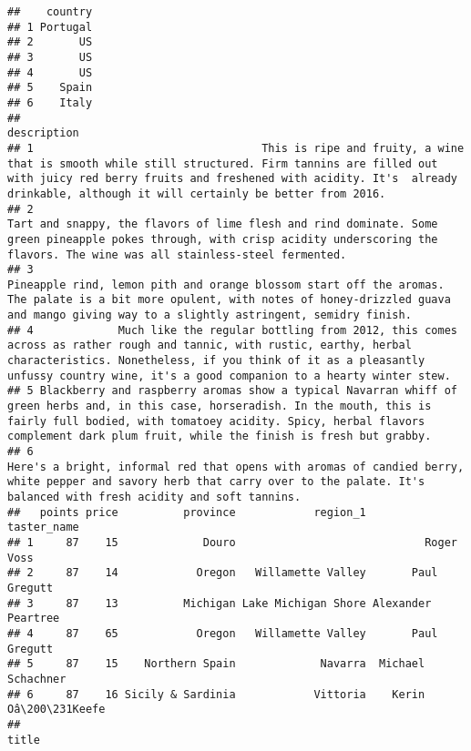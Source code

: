 \documentclass[
]{article}
\begin{document}
\begin{verbatim}
##    country
## 1 Portugal
## 2       US
## 3       US
## 4       US
## 5    Spain
## 6    Italy
##                                                                                                                                                                                                                                                             description
## 1                                   This is ripe and fruity, a wine that is smooth while still structured. Firm tannins are filled out with juicy red berry fruits and freshened with acidity. It's  already drinkable, although it will certainly be better from 2016.
## 2                                                                            Tart and snappy, the flavors of lime flesh and rind dominate. Some green pineapple pokes through, with crisp acidity underscoring the flavors. The wine was all stainless-steel fermented.
## 3                                                               Pineapple rind, lemon pith and orange blossom start off the aromas. The palate is a bit more opulent, with notes of honey-drizzled guava and mango giving way to a slightly astringent, semidry finish.
## 4             Much like the regular bottling from 2012, this comes across as rather rough and tannic, with rustic, earthy, herbal characteristics. Nonetheless, if you think of it as a pleasantly unfussy country wine, it's a good companion to a hearty winter stew.
## 5 Blackberry and raspberry aromas show a typical Navarran whiff of green herbs and, in this case, horseradish. In the mouth, this is fairly full bodied, with tomatoey acidity. Spicy, herbal flavors complement dark plum fruit, while the finish is fresh but grabby.
## 6                                                                                 Here's a bright, informal red that opens with aromas of candied berry, white pepper and savory herb that carry over to the palate. It's balanced with fresh acidity and soft tannins.
##   points price          province            region_1        taster_name
## 1     87    15             Douro                             Roger Voss
## 2     87    14            Oregon   Willamette Valley       Paul Gregutt
## 3     87    13          Michigan Lake Michigan Shore Alexander Peartree
## 4     87    65            Oregon   Willamette Valley       Paul Gregutt
## 5     87    15    Northern Spain             Navarra  Michael Schachner
## 6     87    16 Sicily & Sardinia            Vittoria    Kerin Oâ\200\231Keefe
##                                                                                 title

\end{verbatim}
\end{document}
